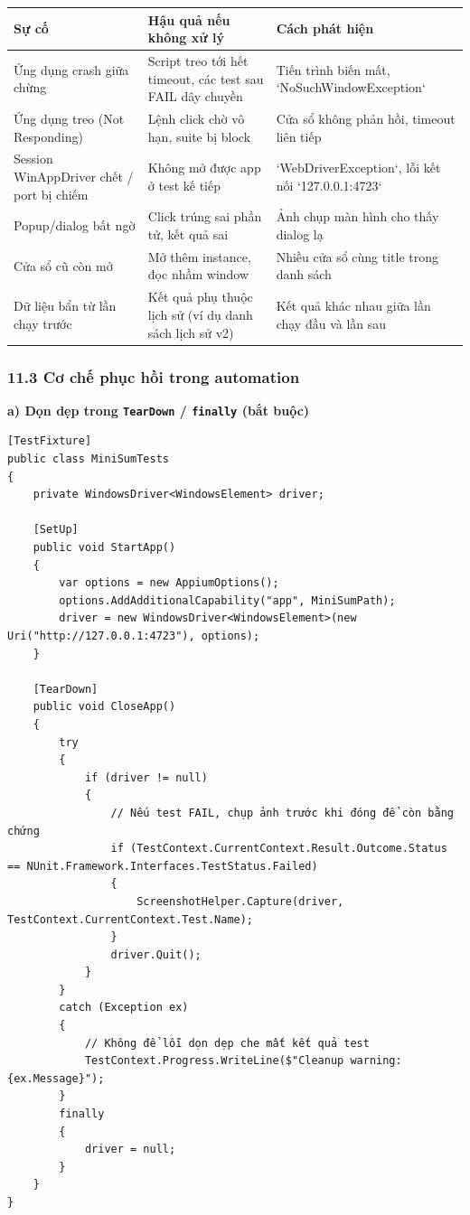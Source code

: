 \begin{table}[H]
\centering
\begin{tabular}{|l|l|l|}
\hline
\textbf{Sự cố} & \textbf{Hậu quả nếu không xử lý} & \textbf{Cách phát hiện} \\ \hline
Ứng dụng crash giữa chừng & Script treo tới hết timeout, các test sau FAIL dây chuyền & Tiến trình biến mất, `NoSuchWindowException` \\ \hline
Ứng dụng treo (Not Responding) & Lệnh click chờ vô hạn, suite bị block & Cửa sổ không phản hồi, timeout liên tiếp \\ \hline
Session WinAppDriver chết / port bị chiếm & Không mở được app ở test kế tiếp & `WebDriverException`, lỗi kết nối `127.0.0.1:4723` \\ \hline
Popup/dialog bất ngờ & Click trúng sai phần tử, kết quả sai & Ảnh chụp màn hình cho thấy dialog lạ \\ \hline
Cửa sổ cũ còn mở & Mở thêm instance, đọc nhầm window & Nhiều cửa sổ cùng title trong danh sách \\ \hline
Dữ liệu bẩn từ lần chạy trước & Kết quả phụ thuộc lịch sử (ví dụ danh sách lịch sử v2) & Kết quả khác nhau giữa lần chạy đầu và lần sau \\ \hline
\end{tabular}
\end{table}




\subsubsection{11.3 Cơ chế phục hồi trong automation}

\textbf{a) Dọn dẹp trong \texttt{TearDown} / \texttt{finally} (bắt buộc)}

\begin{lstlisting}
[TestFixture]
public class MiniSumTests
{
    private WindowsDriver<WindowsElement> driver;

    [SetUp]
    public void StartApp()
    {
        var options = new AppiumOptions();
        options.AddAdditionalCapability("app", MiniSumPath);
        driver = new WindowsDriver<WindowsElement>(new Uri("http://127.0.0.1:4723"), options);
    }

    [TearDown]
    public void CloseApp()
    {
        try
        {
            if (driver != null)
            {
                // Nếu test FAIL, chụp ảnh trước khi đóng để còn bằng chứng
                if (TestContext.CurrentContext.Result.Outcome.Status == NUnit.Framework.Interfaces.TestStatus.Failed)
                {
                    ScreenshotHelper.Capture(driver, TestContext.CurrentContext.Test.Name);
                }
                driver.Quit();
            }
        }
        catch (Exception ex)
        {
            // Không để lỗi dọn dẹp che mất kết quả test
            TestContext.Progress.WriteLine($"Cleanup warning: {ex.Message}");
        }
        finally
        {
            driver = null;
        }
    }
}
\end{lstlisting}



